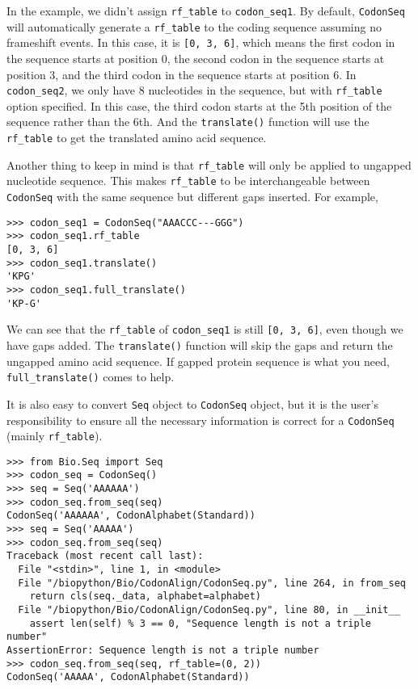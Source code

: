 In the example, we didn't assign \texttt{rf\_table} to
\texttt{codon\_seq1}. By default, \verb|CodonSeq| will automatically
generate a \texttt{rf\_table} to the coding sequence assuming no
frameshift events. In this case, it is \texttt{{[}0, 3, 6{]}}, which
means the first codon in the sequence starts at position 0, the second
codon in the sequence starts at position 3, and the third codon in the
sequence starts at position 6. In \texttt{codon\_seq2}, we only have 8
nucleotides in the sequence, but with \texttt{rf\_table} option
specified. In this case, the third codon starts at the 5th position of
the sequence rather than the 6th. And the \texttt{translate()} function
will use the \texttt{rf\_table} to get the translated amino acid
sequence.

Another thing to keep in mind is that \texttt{rf\_table} will only be
applied to ungapped nucleotide sequence. This makes \texttt{rf\_table}
to be interchangeable between \verb|CodonSeq| with the same sequence
but different gaps inserted. For example,

\begin{verbatim}
>>> codon_seq1 = CodonSeq("AAACCC---GGG")
>>> codon_seq1.rf_table
[0, 3, 6]
>>> codon_seq1.translate()
'KPG'
>>> codon_seq1.full_translate()
'KP-G'
\end{verbatim}

We can see that the \texttt{rf\_table} of \texttt{codon\_seq1} is still
\texttt{{[}0, 3, 6{]}}, even though we have gaps added. The
\verb|translate()| function will skip the gaps and return the ungapped
amino acid sequence. If gapped protein sequence is what you need,
\verb|full_translate()| comes to help.

It is also easy to convert \verb|Seq| object to \verb|CodonSeq|
object, but it is the user's responsibility to ensure all the necessary
information is correct for a \verb|CodonSeq| (mainly \texttt{rf\_table}).

\begin{verbatim}
>>> from Bio.Seq import Seq
>>> codon_seq = CodonSeq()
>>> seq = Seq('AAAAAA')
>>> codon_seq.from_seq(seq)
CodonSeq('AAAAAA', CodonAlphabet(Standard))
>>> seq = Seq('AAAAA')
>>> codon_seq.from_seq(seq)
Traceback (most recent call last):
  File "<stdin>", line 1, in <module>
  File "/biopython/Bio/CodonAlign/CodonSeq.py", line 264, in from_seq
    return cls(seq._data, alphabet=alphabet)
  File "/biopython/Bio/CodonAlign/CodonSeq.py", line 80, in __init__
    assert len(self) % 3 == 0, "Sequence length is not a triple number"
AssertionError: Sequence length is not a triple number
>>> codon_seq.from_seq(seq, rf_table=(0, 2))
CodonSeq('AAAAA', CodonAlphabet(Standard))
\end{verbatim}

